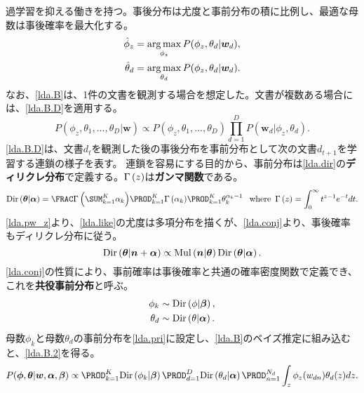 \documentclass[10pt,a4paper]{book}
\begin{document}
過学習を抑える働きを持つ。事後分布は尤度と事前分布の積に比例し、最適な母数は事後確率を最大化する。
%
\begin{equation}
\begin{aligned}
\hat{\phi}_z &= \operatorname*{arg\,max}_{\phi_z} P(\phi_z,\theta_d|\bm{w}_d),\\
\hat{\theta}_d &= \operatorname*{arg\,max}_{\theta_d} P(\phi_z,\theta_d|\bm{w}_d).
\end{aligned}
\end{equation}
%
なお、\eqref{lda.B}は、1件の文書を観測する場合を想定した。文書が複数ある場合には、\eqref{lda.B.D}を適用する。
%
\begin{equation}
\label{eq:lda.B.D}
P(\phi_z,\theta_1,...,\theta_D|\bm{w}) \propto P(\phi_z,\theta_1,...,\theta_D) \prod_{d=1}^D P(\bm{w}_d|\phi_z,\theta_d).
\end{equation}
%
\eqref{lda.B.D}は、文書$d_t$を観測した後の事後分布を事前分布として次の文書$d_{t+1}$を学習する連鎖の様子を表す。
連鎖を容易にする目的から、事前分布は\eqref{lda.dir}の\textbf{ディリクレ分布}で定義する。$\Gamma\left(z\right)$は\textbf{ガンマ関数}である。
%
\begin{equation}
\label{eq:lda.dir}
\Dd{\bm{\theta}|\bm{\alpha}} = \frac{\Gd{\sum_{k=1}^K \alpha_k}}{\prod_{k=1}^K \Gd{\alpha_k}} \prod_{k=1}^K \theta_k^{\alpha_k-1}\;
\where \Gd{z} = \int_0^\infty t^{z-1} e^{-t} dt.
\end{equation}
%
\eqref{lda.pw_z}より、\eqref{lda.like}の尤度は多項分布を描くが、\eqref{lda.conj}より、事後確率もディリクレ分布に従う。
%
\begin{equation}
\label{eq:lda.conj}
\mathrm{Dir}\left(\bm{\theta}|\bm{n}+\bm{\alpha}\right) \propto \mathrm{Mul}\left(\bm{n}|\bm{\theta}\right) \mathrm{Dir}\left(\bm{\theta}|\bm{\alpha}\right).
\end{equation}
%
\eqref{lda.conj}の性質により、事前確率は事後確率と共通の確率密度関数で定義でき、これを\textbf{共役事前分布}と呼ぶ。
%
\begin{equation}
\label{eq:lda.pri}
\begin{aligned}
\phi_k & \sim \mathrm{Dir}\left(\phi|\bm{\beta}\right),\\
\theta_d & \sim \mathrm{Dir}\left(\theta|\bm{\alpha}\right).
\end{aligned}
\end{equation}
%
母数$\phi_k$と母数$\theta_d$の事前分布を\eqref{lda.pri}に設定し、\eqref{lda.B}のベイズ推定に組み込むと、\eqref{lda.B.2}を得る。
%
\begin{equation}
\label{eq:lda.B.2}
P(\bm{\phi},\bm{\theta}|\bm{w},\bm{\alpha},\bm{\beta})
\propto 
\prod_{k=1}^K \Dd{\phi_k|\bm{\beta}} 
\prod_{d=1}^D \Dd{\theta_d|\bm{\alpha}} 
\prod_{n=1}^{N_d} \int_z \phi_z(w_{dn}) \theta_d(z) dz.
\end{equation}
\end{document}
